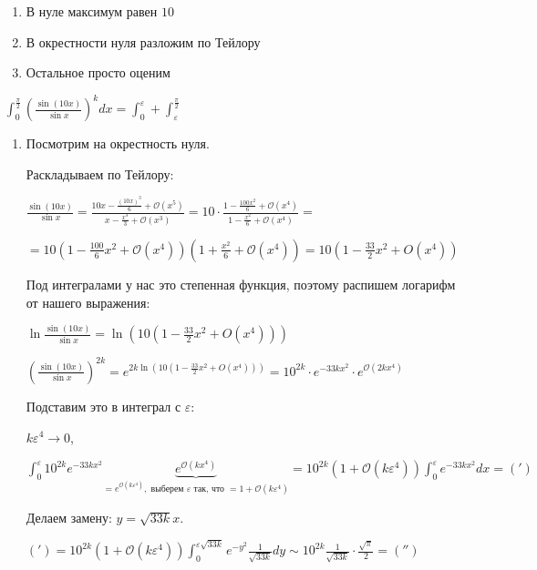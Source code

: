 \begin{example}
    \begin{enumerate}
        \item В нуле максимум равен $10$
        \item В окрестности нуля разложим по Тейлору
        \item Остальное просто оценим
    \end{enumerate}

    $\int_{0}^{\frac{\pi}{2}} \left( \frac{\sin{(10x)}}{\sin{x}} \right)^k dx = \int_{0}^{\varepsilon} + \int_{\varepsilon}^{\frac{\pi}{2}}$


    \begin{enumerate}
        \item {
            Посмотрим на окрестность нуля.

            Раскладываем по Тейлору:

            $\frac{\sin{(10x)}}{\sin{x}} = \frac{10x - \frac{(10x)^3}{6} + \mathcal{O}(x^5)}{x - \frac{x^3}{3} + \mathcal{O}(x^3)} = 10 \cdot \frac{1 - \frac{100 x^2}{6} + \mathcal{O}(x^4)}{1 - \frac{x^2}{6} + \mathcal{O}(x^4)} =$

            $= 10 (1 - \frac{100}{6} x^2 + \mathcal{O}(x^4)) (1 + \frac{x^2}{6} + \mathcal{O}(x^4)) = 10 (1 - \frac{33}{2} x^2 + O(x^4))$

            Под интегралами у нас это степенная функция, поэтому распишем логарифм от нашего выражения:

            $\ln \frac{\sin(10x)}{\sin{x}} = \ln \left(10 (1 - \frac{33}{2} x^2 + O(x^4))\right)$

            $\left( \frac{\sin(10x)}{\sin{x}} \right)^{2k} = e^{2k \ln\left( 10 (1 - \frac{33}{2} x^2 + O(x^4)) \right)} = 10^{2k} \cdot e^{-33 k x^2} \cdot e^{\mathcal{O}(2k x^4)}$

            Подставим это в интеграл с $\varepsilon$:

            $k \varepsilon^4 \rightarrow 0$,

            $\int_{0}^{\varepsilon} 10^{2k} e^{-33k x^2} \underbrace{e^{\mathcal{O}(k x^4)}}_{= e^{\mathcal{O}(k \varepsilon^4)}, \text{ выберем $\varepsilon$ так, что } = 1 + \mathcal{O}(k \varepsilon^4)} = 10^{2k} \left( 1 + \mathcal{O}(k \varepsilon^4) \right) \int_{0}^{\varepsilon} e^{-33 k x^2} dx = (')$

            Делаем замену: $y = \sqrt{33k} x$.

            $(') = 10^{2k} \left(1 + \mathcal{O}(k \varepsilon^4)\right) \int_{0}^{\varepsilon \sqrt{33k}} e^{-y^2} \frac{1}{\sqrt{33k}} dy \sim 10^{2k} \frac{1}{\sqrt{33k}} \cdot \frac{\sqrt{\pi}}{2} = ('')$

}
\end{enumerate}
\end{example}

